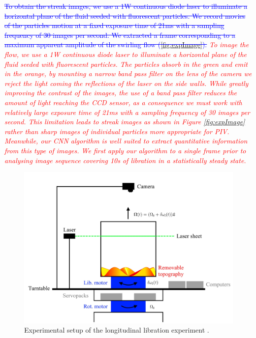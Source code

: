 \documentclass{svjour3}                     %
\newcommand{\new}[1]{\textit{\textcolor{red}{#1}}}
\newcommand{\old}[1]{\textcolor{blue}{\sout{#1}}}
\begin{document}
\old{To obtain the streak images, we use a 1W continuous diode laser to illuminate a horizontal plane of the fluid seeded with fluorescent particles. We record movies of the particles motion at a fixed exposure time of 21ms with a sampling frequency of 30 images per second. We extracted a frame corresponding to a maximum apparent amplitude of the swirling flow (\ref{fig:expImage}).}
\new{To image the flow, we use a 1W continuous diode laser to illuminate a horizontal plane of the fluid seeded with fluorescent particles. The particles absorb in the green and emit in the orange, by mounting a narrow band pass filter on the lens of the camera we reject the light coming the reflections of the laser on the side walls. While greatly improving the contrast of the images, the use of a band pass filter reduces the amount of light reaching the CCD sensor, as a consequence we must work with relatively large exposure time of 21ms with a sampling frequency of 30 images per second. This limitation leads to streak images as shown in Figure \ref{fig:expImage} rather than sharp images of individual particles more appropriate for PIV. Meanwhile, our CNN algorithm is well suited to extract quantitative information from this type of images. We first apply our algorithm to a single frame prior to analysing image sequence covering 10s of libration in a statistically steady state.}

     
\begin{figure}
	\includegraphics[width=\textwidth]{figs/figureExperiment.jpg}
	\caption{Experimental setup of the longitudinal libration experiment \cite{MeisterMSC}.}
	\label{fig:MeisterMSC}
\end{figure}
\end{document}
